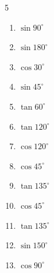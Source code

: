 \begin{multicols}{5}
\begin{enumerate}
  \item $\displaystyle \sin{90^\circ}$

        \phantom{$\displaystyle =1$}

  \item $\displaystyle \sin{180^\circ}$

        \phantom{$\displaystyle =0$}

  \item $\displaystyle \cos{30^\circ}$


\columnbreak %

  \item $\displaystyle \sin{45^\circ}$


  \item $\displaystyle \tan{60^\circ}$


  \item $\displaystyle \tan{120^\circ}$


  \item $\displaystyle \cos{120^\circ}$


  \item $\displaystyle \cos{45^\circ}$


  \item $\displaystyle \tan{135^\circ}$

        \phantom{$\displaystyle =-1$}

  \item $\displaystyle \cos{45^\circ}$


  \item $\displaystyle \tan{135^\circ}$

        \phantom{$\displaystyle =-1$}

  \item $\displaystyle \sin{150^\circ}$


  \item $\displaystyle \cos{90^\circ}$


\end{enumerate}
\end{multicols}
